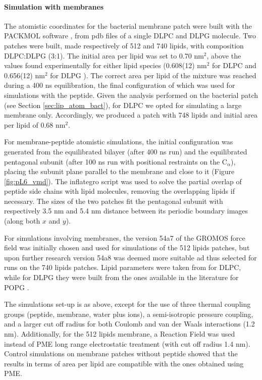 \paragraph{Simulation with membranes} The atomistic coordinates for the bacterial membrane patch were built with the PACKMOL software \citep{Martinez2009}, from pdb files of a single DLPC \citep{PogerOrig} and DLPG \citep{Kukol2009} molecule. Two patches were built, made respectively of 512 and 740 lipids, with composition DLPC:DLPG (3:1). The initial area per lipid was set to 0.70 nm$^2$, above the values found experimentally for either lipid species (0.608(12) nm$^2$ for DLPC \citep{Kucerka2011} and 0.656(12) nm$^2$ for DLPG \citep{Pan2012}). The correct area per lipid of the mixture was reached during a 400 ns equilibration, the final configuration of which was used for simulations with the peptide.
Given the analysis performed on the bacterial patch (see Section \ref{sec:lip_atom_bact}), for DLPC we opted for simulating a large membrane only. Accordingly, we produced a patch with 748 lipids and initial area per lipid of 0.68 nm$^2$.

For membrane-peptide atomistic simulations, the initial configuration was generated from the equilibrated bilayer (after 400 ns run) and the equilibrated pentagonal subunit (after 100 ns run with positional restraints on the C$_\alpha$), placing the subunit plane parallel to the membrane and close to it (Figure \ref{fig:pL6_vmd}).
%
The inflategro script \citep{Kandt2007} was used to solve the partial overlap of peptide side chains with lipid molecules, removing the overlapping lipids if necessary.
%
The sizes of the two patches fit the pentagonal subunit with respectively 3.5 nm and 5.4 nm distance between its periodic boundary images (along both $x$ and $y$).

For simulations involving membranes, the version 54a7 of the GROMOS force field \citep{Schmid2011} was initially chosen and used for simulations of the 512 lipids patches, but upon further research version 54a8 \citep{Oostenbrink2005, Reif2013} was deemed more suitable ad thus selected for runs on the 740 lipids patches. Lipid parameters were taken from \citep{PogerOrig} for DLPC, while for DLPG they were built from the ones available in the literature for POPG \citep{Kukol2009}.

The simulations set-up is as above, except for the use of three thermal coupling groups (peptide, membrane, water plus ions), a semi-isotropic pressure coupling, and a larger cut off radius for both Coulomb and van der Waals interactions (1.2 nm). Additionally, for the 512 lipids membrane, a Reaction Field \citep{Tironi1995} was used instead of PME long range electrostatic treatment (with cut off radius 1.4 nm). Control simulations on membrane patches without peptide showed that the results in terms of area per lipid are compatible with the ones obtained using PME.

